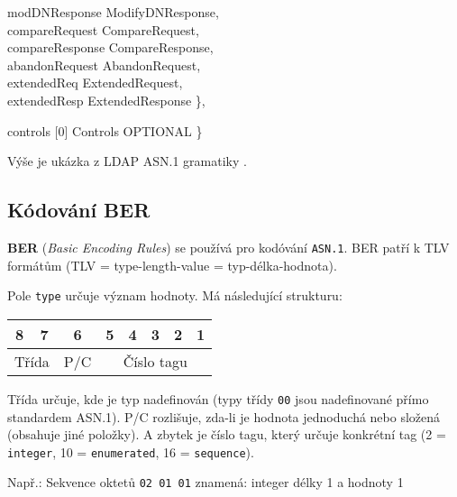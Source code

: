 \documentclass[a4paper, 11pt]{article}
\newcommand{\tab}[1][1cm]{\hspace*{#1}}
\newenvironment{envtt}{\ttfamily}{\par}
\begin{document}
\begin{center}
\begin{minipage}{.7\textwidth}
\begin{flushleft}
\begin{envtt}
\begin{tabbing}
	\tab\tab modDNResponse  \> ModifyDNResponse, \\
	\tab\tab compareRequest \> CompareRequest, \\
	\tab\tab compareResponse\> CompareResponse, \\
	\tab\tab abandonRequest \> AbandonRequest, \\
	\tab\tab extendedReq    \> ExtendedRequest, \\
	\tab\tab extendedResp   \> ExtendedResponse \},
\end{tabbing}
\tab		controls       [0] Controls OPTIONAL \}
\end{envtt}
\end{flushleft}
\end{minipage}
\end{center}
\bigskip

Výše je ukázka z LDAP ASN.1 gramatiky \cite{rfc_2251}.

\pagebreak


\subsection{Kódování BER}

\textbf{BER} (\textit{Basic Encoding Rules}) se používá pro kodóvání \texttt{ASN.1}. BER patří k TLV formátům (TLV = type-length-value = typ-délka-hodnota).
\bigskip

Pole \texttt{type} určuje význam hodnoty. Má následující strukturu:
	
\begin{table}[h]
	\centering
	\begin{tabular}{|c|c|c|c|c|c|c|c|}
		\hline
		8            & 7            & 6   & 5    & 4    & 3    & 2    & 1   \\ \hline
		\multicolumn{2}{|c|}{Třída} & P/C & \multicolumn{5}{c|}{Číslo tagu} \\ \hline
	\end{tabular}
\end{table}

Třída určuje, kde je typ nadefinován (typy třídy \texttt{00} jsou nadefinované přímo standardem ASN.1). P/C rozlišuje, zda-li je hodnota jednoduchá nebo složená (obsahuje jiné položky). A zbytek je číslo tagu, který určuje konkrétní tag (2 = \texttt{integer}, 10 = \texttt{enumerated}, 16 = \texttt{sequence}).
\bigskip


Např.: Sekvence oktetů \texttt{02 01 01} znamená: integer délky 1 a hodnoty 1


\pagebreak
\end{document}

